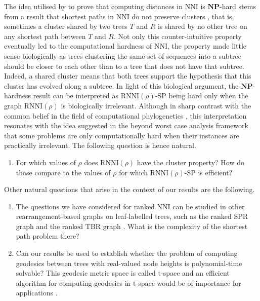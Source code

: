 \documentclass[11pt]{amsart}
\newcommand{\rnni}{\mathrm{RNNI}}
\newcommand{\nni}{\mathrm{NNI}}
\newcommand{\spr}{\mathrm{SPR}}
\newcommand{\tbr}{\mathrm{TBR}}
\newcommand{\np}{\mathbf{NP}}
\newcommand{\decprob}[1]{\rnni(#1)\text{-}\mathrm{SP}}
\begin{document}
The idea utilised by \textcite{Dasgupta2000-xa} to prove that computing distances in $\nni$ is $\np$-hard stems from a result that shortest paths in $\nni$ do not preserve clusters \autocite{Li1996-zw}, that is, sometimes a cluster shared by two trees $T$ and $R$ is shared by no other tree on any shortest path between $T$ and $R$.
Not only this counter-intuitive property eventually led to the computational hardness of $\nni$, the property made little sense biologically as trees clustering the same set of sequences into a subtree should be closer to each other than to a tree that does not have that subtree.
Indeed, a shared cluster means that both trees support the hypothesis that this cluster has evolved along a subtree.
In light of this biological argument, the $\np$-hardness result can be interpreted as $\decprob{\rho}$ being hard only when the graph $\rnni(\rho)$ is biologically irrelevant.
Although in sharp contrast with the common belief in the field of computational phylogenetics \autocite{Whidden2018-fw}, this interpretation resonates with the idea suggested in the beyond worst case analysis framework \autocite{Roughgarden2019-to} that some problems are only computationally hard when their instances are practically irrelevant.
The following question is hence natural.
\begin{enumerate}
\item For which values of $\rho$ does $\rnni(\rho)$ have the cluster property?
How do those compare to the values of $\rho$ for which $\decprob{\rho}$ is efficient?
\end{enumerate}
Other natural questions that arise in the context of our results are the following.
\begin{enumerate}
\addtocounter{enumi}{1}
\item The questions we have considered for ranked $\nni$ can be studied in other rearrangement-based graphs on leaf-labelled trees, such as the ranked $\spr$ graph and the ranked $\tbr$ graph \autocite{Semple2003-nj}.
What is the complexity of the shortest path problem there?

\item Can our results be used to establish whether the problem of computing geodesics between trees with real-valued node heights is polynomial-time solvable?
This geodesic metric space is called $\mathrm t$-space and an efficient algorithm for computing geodesics in $\mathrm t$-space would be of importance for applications \autocite{Gavryushkin2016-uu}.
\end{enumerate}


\printbibliography
\end{document}
